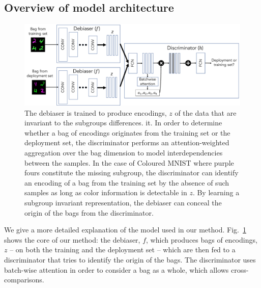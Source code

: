 \subsection{Overview of model architecture}\label{sec:model-arch}
\begin{figure}[htp]
    \centering
    \includegraphics[width=\textwidth]{supmatch/figures/illustrations/architecture.pdf}
    \caption{%
      The debiaser is trained to produce encodings, $z$ of the data that are
      invariant to the subgroups differences. %
      it. 
      In order to determine whether a bag of encodings originates from the training set or the
      deployment set, the discriminator performs an attention-weighted aggregation over the bag
      dimension to model interdependencies between the samples. 
      In the case of Coloured MNIST where
      {\color{purple}purple} fours constitute the missing subgroup, the discriminator can identify
      an encoding of a bag from the training set by the absence of such samples as long as color
      information is detectable in $z$. 
      By learning a subgroup invariant representation, the debiaser can conceal the origin of the
      bags from the discriminator.
  } \label{fig:architecture}
\end{figure}%
%
We give a more detailed explanation of the model used in our method.
Fig.~\ref{fig:architecture} shows the core of our method:
the debiaser, $f$, which produces bags of encodings, $z$
-- on both the training and the deployment set --
which are then fed to a discriminator that tries to identify the origin of the bags.
The discriminator uses batch-wise attention in order to consider a bag as a whole,
which allows cross-comparisons.
%
